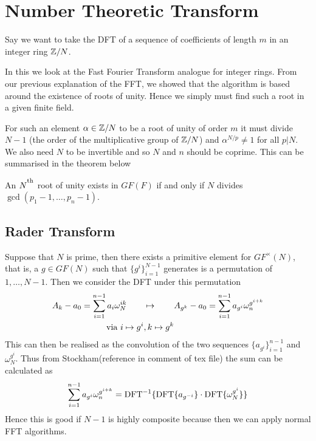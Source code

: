\section{Number Theoretic Transform}
\label{sec:ntt}

Say we want to take the DFT of a sequence of coefficients of length $m$ in an integer ring ${\mathbb Z}/N$.

In this we look at the Fast Fourier Transform analogue for integer rings. From our previous explanation of the FFT, we showed that the algorithm is based around the existence of roots of unity. Hence we simply must find such a root in a given finite field.

For such an element $\alpha \in {\mathbb Z}/N$ to be a root of unity of order $m$ it must divide $N - 1$ (the order of the multiplicative group of ${\mathbb Z}/N$) and $\alpha^{N/p} \neq 1$ for all $p | N$. We also need $N$ to be invertible and so $N$ and $n$ should be coprime. This can be summarised in the theorem below

\begin{theorem}
  An $N^\textsuperscript{\textup{th}}$ root of unity exists in $GF(F)$ if and only if $N$ divides $\gcd(p_1 - 1, \ldots, p_n - 1)$.
\end{theorem}


\subsection{Rader Transform}
\label{subsec:rt}



Suppose that $N$ is prime, then there exists a primitive element for $GF^\times(N)$, that is, a $g \in GF(N)$ such that $\{g^i\}_{i=1}^{N-1}$ generates is a permutation of $1, \ldots, N-1$. Then we consider the DFT under this permutation
\begin{align*}
  A_k - a_0 = \sum^{n-1}_{i=1} a_i \omega_N^{ik} \qquad &\mapsto \qquad A_{g^k} - a_0 = \sum^{n-1}_{i=1} a_{g^i}\omega_n^{g^{i+k}}\\
  \textrm{ via } i \mapsto g^i&, k \mapsto g^k
\end{align*}
This can then be realised as the convolution of the two sequences $\{a_{g^i}\}_{i=1}^{n-1}$ and $\omega_N^{g^i}$. Thus from Stockham(reference in comment of tex file) the sum can be calculated as
\[
  \sum^{n-1}_{i=1} a_{g^i}\omega_n^{g^{i+k}} = \textrm{DFT}^{-1}\{\textrm{DFT}\{a_{g^{-i}}\}\cdot \textrm{DFT}\{\omega_N^{g^i}\}\}
\]
Hence this is good if $N - 1$ is highly composite because then we can apply normal FFT algorithms.

